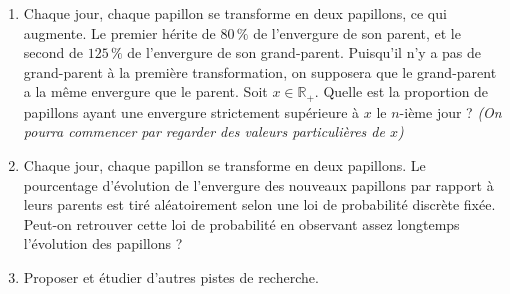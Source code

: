\begin{enumerate}
  \item Chaque jour, chaque papillon se transforme en deux papillons, ce qui augmente. Le premier hérite de $80\,\%$ de l'envergure de son parent, et le second de $125\,\%$ de l'envergure de son grand-parent. Puisqu'il n'y a pas de grand-parent à la première transformation, on supposera que le grand-parent a la même envergure que le parent. Soit $x \in \mathbb{R}_+$. Quelle est la proportion de papillons ayant une envergure strictement supérieure à $x$ le $n$-ième jour ? \textit{(On pourra commencer par regarder des valeurs particulières de $x$)}

  \item Chaque jour, chaque papillon se transforme en deux papillons. Le pourcentage d'évolution de l'envergure des nouveaux papillons par rapport à leurs parents est tiré aléatoirement selon une loi de probabilité discrète fixée. Peut-on retrouver cette loi de probabilité en observant assez longtemps l'évolution des papillons ?

  \item Proposer et étudier d'autres pistes de recherche.
\end{enumerate}
